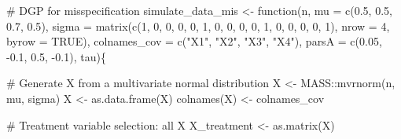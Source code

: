 \documentclass[
  11pt,
  a4paper,
]{article}
\newenvironment{Shaded}{}{}
\newcommand{\AttributeTok}[1]{\textcolor[rgb]{0.84,0.23,0.29}{#1}}
\newcommand{\CommentTok}[1]{\textcolor[rgb]{0.42,0.45,0.49}{#1}}
\newcommand{\ConstantTok}[1]{\textcolor[rgb]{0.00,0.36,0.77}{#1}}
\newcommand{\ControlFlowTok}[1]{\textcolor[rgb]{0.84,0.23,0.29}{#1}}
\newcommand{\DecValTok}[1]{\textcolor[rgb]{0.00,0.36,0.77}{#1}}
\newcommand{\FloatTok}[1]{\textcolor[rgb]{0.00,0.36,0.77}{#1}}
\newcommand{\FunctionTok}[1]{\textcolor[rgb]{0.44,0.26,0.76}{#1}}
\newcommand{\NormalTok}[1]{\textcolor[rgb]{0.14,0.16,0.18}{#1}}
\newcommand{\OtherTok}[1]{\textcolor[rgb]{0.44,0.26,0.76}{#1}}
\newcommand{\SpecialCharTok}[1]{\textcolor[rgb]{0.00,0.36,0.77}{#1}}
\newcommand{\StringTok}[1]{\textcolor[rgb]{0.01,0.18,0.38}{#1}}
\theoremstyle{plain}
\theoremstyle{plain}
\theoremstyle{plain}
\theoremstyle{definition}
\theoremstyle{remark}
\begin{document}
\begin{Shaded}
\begin{Highlighting}[]
\CommentTok{\# DGP for misspecification }
\NormalTok{simulate\_data\_mis }\OtherTok{\textless{}{-}} \ControlFlowTok{function}\NormalTok{(n, }
                              \AttributeTok{mu =} \FunctionTok{c}\NormalTok{(}\FloatTok{0.5}\NormalTok{, }\FloatTok{0.5}\NormalTok{, }\FloatTok{0.7}\NormalTok{, }\FloatTok{0.5}\NormalTok{),}
                              \AttributeTok{sigma =}  \FunctionTok{matrix}\NormalTok{(}\FunctionTok{c}\NormalTok{(}\DecValTok{1}\NormalTok{, }\DecValTok{0}\NormalTok{, }\DecValTok{0}\NormalTok{, }\DecValTok{0}\NormalTok{, }
                                                \DecValTok{0}\NormalTok{, }\DecValTok{1}\NormalTok{, }\DecValTok{0}\NormalTok{, }\DecValTok{0}\NormalTok{, }
                                                \DecValTok{0}\NormalTok{, }\DecValTok{0}\NormalTok{, }\DecValTok{1}\NormalTok{, }\DecValTok{0}\NormalTok{,}
                                                \DecValTok{0}\NormalTok{, }\DecValTok{0}\NormalTok{, }\DecValTok{0}\NormalTok{, }\DecValTok{1}\NormalTok{), }
                                              \AttributeTok{nrow =} \DecValTok{4}\NormalTok{, }\AttributeTok{byrow =} \ConstantTok{TRUE}\NormalTok{),}
                              \AttributeTok{colnames\_cov =} \FunctionTok{c}\NormalTok{(}\StringTok{"X1"}\NormalTok{, }\StringTok{"X2"}\NormalTok{, }\StringTok{"X3"}\NormalTok{, }\StringTok{"X4"}\NormalTok{),}
                              \AttributeTok{parsA =}  \FunctionTok{c}\NormalTok{(}\FloatTok{0.05}\NormalTok{, }\SpecialCharTok{{-}}\FloatTok{0.1}\NormalTok{, }\FloatTok{0.5}\NormalTok{, }\SpecialCharTok{{-}}\FloatTok{0.1}\NormalTok{),}
\NormalTok{                              tau)\{}
  
  \CommentTok{\# Generate X from a multivariate normal distribution}
\NormalTok{  X }\OtherTok{\textless{}{-}}\NormalTok{ MASS}\SpecialCharTok{::}\FunctionTok{mvrnorm}\NormalTok{(n, mu, sigma)}
\NormalTok{  X }\OtherTok{\textless{}{-}} \FunctionTok{as.data.frame}\NormalTok{(X)}
  \FunctionTok{colnames}\NormalTok{(X) }\OtherTok{\textless{}{-}}\NormalTok{ colnames\_cov}
  
  \CommentTok{\# Treatment variable selection: all X}
\NormalTok{  X\_treatment }\OtherTok{\textless{}{-}} \FunctionTok{as.matrix}\NormalTok{(X)}
  

\end{Highlighting}
\end{Shaded}
\end{document}
